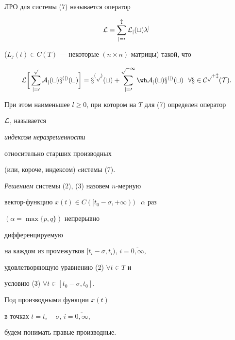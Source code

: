 \begin{defn}


ЛРО для системы (7) называется оператор


\begin{equation}


\cal L=\sum_{j=0}^{l}{L_j(t)\lambda^j}


\end{equation}


($L_j(t) \in C(T)$ --- некоторые $(n \times n)$-матрицы) такой, что


$$


\cal L \bigg[ \sum_{j=0}^{p}{A_j(t)x^{(j)}(t)} \bigg] =


x^{(p)}(t)+\sum_{j=0}^{p-1}{\wh A_j(t)x^{(j)}(t)}


\ \ \forall x \in C^{p+l}(T).


$$


При этом наименьшее $l \ge 0$, при котором на $T$ для (7) определен оператор 


$\cal L$, называется {\it индексом неразрешенности 


относительно старших производных}


(или, короче, индексом) cистемы (7).


\end{defn}





\begin{defn}


{\it Решением} системы (2), (3) назовем $n$-мерную


вектор-функцию $x(t) \in C([t_0-\sigma , +\infty ))$ \ $\alpha$ раз 


$(\alpha =\max \lbrace p,q \rbrace )$ непрерывно 


дифференцируемую


на каждом из промежутков $[t_i-\sigma, t_i )$, $i=\overline{0,\infty}$,


удовлетворяющую уравнению (2)\; $\forall t \in T$ и 


условию (3) $\forall t \in [t_0-\sigma , t_0]$.


\end{defn}





Под производными функции $x(t)$ 


в точках $t=t_i-\sigma$, $i=\overline{0, \infty}$,


будем понимать правые производные.





